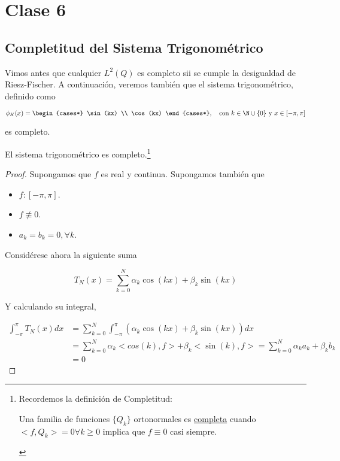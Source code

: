 \section{Clase 6}
\subsection{Completitud del Sistema Trigonométrico}

Vimos antes que cualquier $L^2(Q)$ es completo sii se cumple la desigualdad de Riesz-Fischer. A continuación, veremos también que el sistema trigonométrico, definido como

\[
    \phi_K (x) = \begin{cases*}
                      \sin(kx) \\
                      \cos(kx)
                  \end{cases*}
    , \quad \text{con $k \in \N \cup \{0\}$ y $x \in [- \pi, \pi]$}
\]

es completo.

\begin{teo}
    El sistema trigonométrico es completo.\footnote{Recordemos la definición de Completitud: \begin{defn} Una familia de funciones $\{Q_k\}$ ortonormales es \ul{completa} cuando $<f, Q_k> = 0 \forall k \geq 0$ implica que $f \equiv 0$ casi siempre.\end{defn}}
\end{teo}

\begin{proof}
    Supongamos que $f$ es real y continua. Supongamos también que

    \begin{itemize}
        \item $f: [-\pi, \pi]$.
        \item $f \not\equiv 0$.
        \item $a_k = b_k = 0, \forall k$.
    \end{itemize}

    Considérese ahora la siguiente suma

    \[
        T_N(x) = \sum_{k=0}^{N} \alpha_k \cos(kx) + \beta_k\sin(kx)
    \]

    Y calculando su integral,

    \begin{equation*}
        \begin{split}
            \int_{-\pi}^{\pi} T_N(x)dx &= \sum_{k=0}^{N} \int_{-\pi}^{\pi} \left( \alpha_k \cos(kx) + \beta_k \sin(kx) \right) dx \\
            &= \sum_{k=0}^{N} \alpha_k <cos(k), f> + \beta_k <\sin(k), f> = \sum_{k=0}^{N} \alpha_k a_k + \beta_k b_k \\
            &= 0
        \end{split}
    \end{equation*}
\end{proof}

